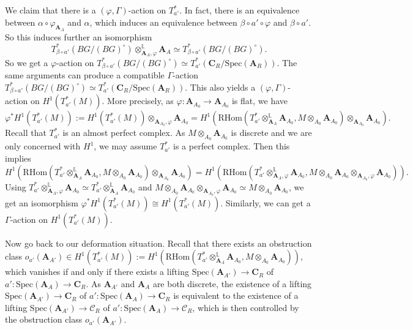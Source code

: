 \documentclass[10pt]{article}
\numberwithin{equation}{section}
\newcommand{\bL}{{\mathbb L}}
\newcommand{\calC}{{\mathcal C}}
\newcommand{\Spec}{{\mathrm{Spec}}}         %
\newcommand{\bfA}{{\textbf{A}}}
\newcommand{\bfC}{{\textbf{C}}}
\newcommand{\RHom}{{\mathrm{RHom}}}
\begin{document}
We claim that there is a $(\varphi,\Gamma)$-action on $T^*_{a'}$. In fact, there is an equivalence between $\alpha\circ\varphi_{\bfA_A}$ and $\alpha$, which induces an equivalence between $\beta\circ a'\circ\varphi$ and $\beta\circ a'$. So this induces further an isomorphism 
\[
T^*_{\beta\circ a'}(BG/(BG)^{\circ})\otimes^{\bL}_{\bfA_A,\varphi}\bfA_A\simeq T^*_{\beta\circ a'}(BG/(BG)^{\circ}).
\]
So we get a $\varphi$-action on $T^*_{\beta\circ a'}(BG/(BG)^{\circ})\simeq T^*_{a'}(\bfC_R/\Spec(\bfA_R))$. The same arguments can produce a compatible $\Gamma$-action $T^*_{\beta\circ a'}(BG/(BG)^{\circ})\simeq T^*_{a'}(\bfC_R/\Spec(\bfA_R))$. This also yields a $(\varphi,\Gamma)$-action on $H^1(T^*_{a'}(M))$. More precisely, as  $\varphi:\bfA_{A_0}\to \bfA_{A_0}$ is flat, we have 
\[
\varphi^*H^1(T^*_{a'}(M)):=H^1(T^*_{a'}(M))\otimes_{\bfA_{A_0},\varphi}\bfA_{A_0}=H^1(\RHom(T^*_{a'}\otimes^{\bL}_{\bfA_{A}}\bfA_{A_0},M\otimes_{A_0}\bfA_{A_0})\otimes_{\bfA_{A_0}}\bfA_{A_0}).
\]
Recall that $T^*_{a'}$ is an almost perfect complex. As $M\otimes_{A_0}\bfA_{A_0}$ is discrete and we are only concerned with $H^1$, we may assume $T^*_{a'}$ is a perfect complex. Then this implies
\[
H^1(\RHom(T^*_{a'}\otimes^{\bL}_{\bfA_{A}}\bfA_{A_0},M\otimes_{A_0}\bfA_{A_0})\otimes_{\bfA_{A_0}}\bfA_{A_0})=H^1(\RHom(T^*_{a'}\otimes^{\bL}_{\bfA_{A},\varphi}\bfA_{A_0},M\otimes_{A_0}\bfA_{A_0}\otimes_{\bfA_{A_0},\varphi}\bfA_{A_0})).
\]
Using $T^*_{a'}\otimes^{\bL}_{\bfA_{A},\varphi}\bfA_{A_0}\simeq T^*_{a'}\otimes^{\bL}_{\bfA_{A}}\bfA_{A_0}$ and $M\otimes_{A_0}\bfA_{A_0}\otimes_{\bfA_{A_0},\varphi}\bfA_{A_0}\simeq M\otimes_{A_0}\bfA_{A_0}$, we get an isomorphism $\varphi^*H^1(T^*_{a'}(M))\cong H^1(T^*_{a'}(M))$. Similarly, we can get a $\Gamma$-action on $H^1(T^*_{a'}(M))$.


Now go back to our deformation situation. Recall that there exists an obstruction class $o_{a'}(\bfA_{A'})\in H^1(T^*_{a'}(M)):=H^1(\RHom(T^*_{a'}\otimes^{\bL}_{\bfA_A}\bfA_{A_0},M\otimes_{A_0}\bfA_{A_0}))$, which vanishes if and only if there exists a lifting $\Spec(\bfA_{A'})\to \bfC_R$ of $a':\Spec(\bfA_A)\to \bfC_R$. As $\bfA_{A'}$ and $\bfA_A$ are both discrete, the existence of a lifting $\Spec(\bfA_{A'})\to \bfC_R$ of $a':\Spec(\bfA_A)\to \bfC_R$ is equivalent to the existence of a lifting $\Spec(\bfA_{A'})\to \calC_R$ of $a':\Spec(\bfA_A)\to \calC_R$, which is then controlled by the obstruction class $o_{a'}(\bfA_{A'})$.
\end{document}

